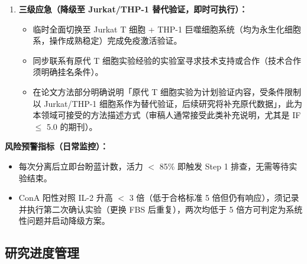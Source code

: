 \documentclass[12pt,a4paper,twoside]{article}
\begin{document}
\begin{warningbox}
\begin{enumerate}
  \item \textbf{三级应急（降级至 Jurkat/THP-1 替代验证，即时可执行）：}
  \begin{itemize}
    \item 临时全面切换至 Jurkat T 细胞 + THP-1 巨噬细胞系统（均为永生化细胞系，操作成熟稳定）完成免疫激活验证。
    \item 同步联系有原代 T 细胞实验经验的实验室寻求技术支持或合作（技术合作须明确挂名条件）。
    \item 在论文方法部分明确说明「原代 T 细胞实验为计划验证内容，受条件限制以 Jurkat/THP-1 细胞系作为替代验证，后续研究将补充原代数据」，此为本领域可接受的方法描述方式（审稿人通常接受此类补充说明，尤其是 IF $\leq$ 5.0 的期刊）。
  \end{itemize}
\end{enumerate}

\textbf{风险预警指标（日常监控）：}
\begin{itemize}
  \item 每次分离后立即台盼蓝计数，活力 $<$ 85\% 即触发 Step 1 排查，无需等待实验结束。
  \item ConA 阳性对照 IL-2 升高 $<$ 3 倍（低于合格标准 5 倍但仍有响应），须记录并执行第二次确认实验（更换 FBS 后重复），两次均低于 5 倍方可判定为系统性问题并启动降级方案。
\end{itemize}
\end{warningbox}

\subsection{研究进度管理}
\label{sec:module9_timeline}
\end{document}
